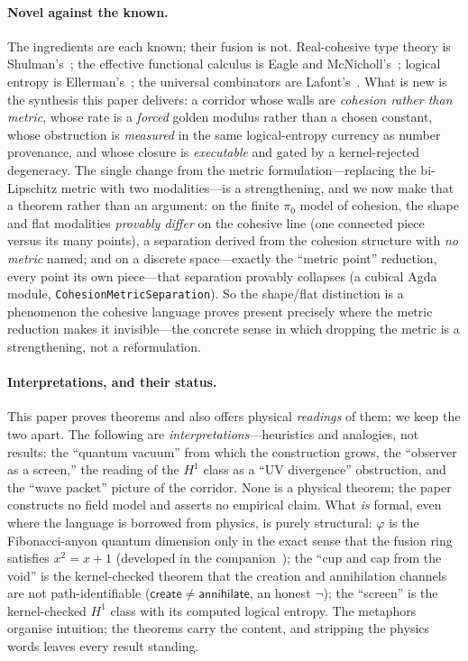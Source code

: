 \documentclass[11pt,letterpaper]{article}
\theoremstyle{plain}
\theoremstyle{definition}
\theoremstyle{remark}
\begin{document}
\paragraph{Novel against the known.}
The ingredients are each known; their fusion is not. Real-cohesive type theory is
Shulman's~\citep{shulman2018brouwer}; the effective functional calculus is Eagle
and McNicholl's~\citep{eagle2017computable}; logical entropy is
Ellerman's~\citep{ellerman2018logical}; the universal combinators are
Lafont's~\citep{lafont1997interaction}. What is new is the synthesis this paper
delivers: a corridor whose walls are \emph{cohesion
rather than metric}, whose rate is a \emph{forced} golden modulus rather than a
chosen constant, whose obstruction is \emph{measured} in the same logical-entropy
currency as number provenance, and whose closure is \emph{executable} and gated by
a kernel-rejected degeneracy. The single change from the metric formulation---replacing the
bi-Lipschitz metric with two modalities---is a strengthening, and we now make that a
theorem rather than an argument: on the finite $\pi_0$ model of cohesion, the shape and
flat modalities \emph{provably differ} on the cohesive line (one connected piece versus
its many points), a separation derived from the cohesion structure with \emph{no metric}
named; and on a discrete space---exactly the ``metric point'' reduction, every point its
own piece---that separation provably collapses (a cubical Agda module,
\texttt{CohesionMetricSeparation}). So the shape/flat distinction is a phenomenon the
cohesive language proves present precisely where the metric reduction makes it
invisible---the concrete sense in which dropping the metric is a strengthening, not a
reformulation.

\paragraph{Interpretations, and their status.}
This paper proves theorems and also offers physical \emph{readings} of them; we keep the
two apart. The following are \emph{interpretations}---heuristics and analogies, not
results: the ``quantum vacuum'' from which the construction grows, the ``observer as a
screen,'' the reading of the $H^1$ class as a ``UV divergence'' obstruction, and the
``wave packet'' picture of the corridor. None is a physical theorem; the paper constructs
no field model and asserts no empirical claim. What \emph{is} formal, even where the
language is borrowed from physics, is purely structural: $\varphi$ is the Fibonacci-anyon
quantum dimension only in the exact sense that the fusion ring satisfies $x^2=x+1$
(developed in the companion~\citep{iaom_wheel}); the ``cup and cap from the void'' is the kernel-checked theorem that
the creation and annihilation channels are not path-identifiable ($\mathsf{create}\neq
\mathsf{annihilate}$, an honest $\neg$); the ``screen'' is the kernel-checked $H^1$ class
with its computed logical entropy. The metaphors organise intuition; the theorems carry
the content, and stripping the physics words leaves every result standing.
\end{document}
